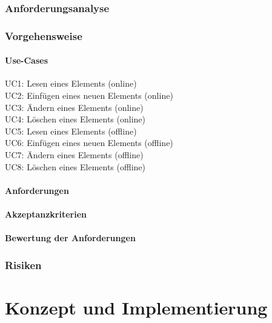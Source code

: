 \documentclass[oneside,11pt,parskip=half,ngerman]{scrreprt}
\begin{document}
\section{Anforderungsanalyse}\label{anforderungsanalyse}

\section{Vorgehensweise}\label{vorgehensweise}

\subsection{Use-Cases}\label{use-cases}

UC1: Lesen eines Elements (online)\\UC2: Einfügen eines neuen Elements
(online)\\UC3: Ändern eines Elements (online)\\UC4: Löschen eines
Elements (online)\\UC5: Lesen eines Elements (offline)\\UC6: Einfügen
eines neuen Elements (offline)\\UC7: Ändern eines Elements
(offline)\\UC8: Löschen eines Elements (offline)

\subsection{Anforderungen}\label{anforderungen}

\subsection{Akzeptanzkriterien}\label{akzeptanzkriterien}

\subsection{Bewertung der
Anforderungen}\label{bewertung-der-anforderungen}

\section{Risiken}\label{risiken}

\part[Teil iii]{Konzept und Implementierung}
\end{document}
